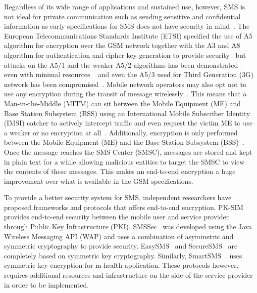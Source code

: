 \documentclass[journal]{./IEEE/IEEEtran}
\begin{document}
Regardless of its wide range of applications and sustained use, however,
SMS is not ideal for private communication such as sending sensitive and
confidential information as early specifications for SMS does not have security
in mind~\cite{3gpp2}. The European Telecommunications Standards Institute (ETSI)
specified the use of A5 algorithm for encryption over the GSM network together
with the A3 and A8 algorithm for authentication and cipher key generation to
provide security~\cite{Schiller2011} but attacks on the A5/1 and the weaker
A5/2 algorithms has been demonstrated even with minimal resources
~\cite{a512001, a522007,Barkan_Biham_Keller_2003} and even the A5/3 used for
Third Generation (3G) network has been compromised~\cite{a532010}.
Mobile network operators may also opt not to use any encryption during the
transit of message wirelessly~\cite{gsm348}. This means that a
Man-in-the-Middle (MITM) can sit between the Mobile Equipment (ME) and
Base Station Subsystem (BSS) using an International Mobile Subscriber Identity
(IMSI) catcher to actively intercept traffic and even request the victim ME
to use a weaker or no encryption at all~\cite{Cattaneo_DeMaio_Faruolo_Petrillo_2013}.
Additionally, encryption is only performed between the Mobile Equipment (ME)
and the Base Station Subsystem (BSS)~\cite{Schiller2011}. Once the message
reaches the SMS Center (SMSC), messages are stored and kept in plain text for a
while allowing malicious entities to target the SMSC to
view the contents of these messages. This makes an end-to-end encryption a huge
improvement over what is available in the GSM specifications.

To provide a better security system for SMS, independent researchers have
proposed frameworks and protocols that offers end-to-end encryption.
PK-SIM~\cite{PKSIMcard07} provides end-to-end security between the mobile user
and service provider through Public Key Infrastructure (PKI).
SMSSec~\cite{SMSSec08} was developed using the Java Wireless Messaging API (WAP)
and uses a combination of asymmetric and symmetric cryptography to provide
security. EasySMS~\cite{EasySMS14} and SecureSMS~\cite{SecureSMS14} are
completely based on symmetric key cryptography. Similarly, SmartSMS
~\cite{SmartSMS16} uses symmetric key encryption for m-health application.
These protocols however, requires additional resources and infrastructure
on the side of the service provider in order to be implemented.
\end{document}
